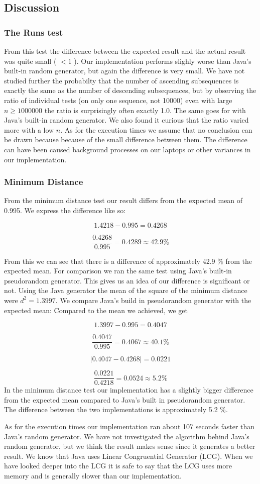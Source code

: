 \subsection{Discussion}
\subsubsection{The Runs test}
From this test the difference between the expected result and the actual result was quite small ( $< 1$ \textperthousand). Our implementation performs slighly worse than Java's built-in random generator, but again the difference is very small. We have not studied further the probabilty that the number of ascending subsequences is exactly the same as the number of descending subsequences, but by observing the ratio of individual tests (on only one sequence, not 10000) even with large $n \ge 1000000$ the ratio is surprisingly often exactly 1.0. The same goes for with Java's built-in random generator. We also found it curious that the ratio varied more with a low $n$. As for the execution times we assume that no conclusion can be drawn because because of the small difference between them. The difference can have been caused background processes on our laptops or other variances in our implementation.

\subsubsection{Minimum Distance}
From the minimum distance test our result differs from the expected mean of 0.995. We express the difference like so:

\[1.4218 - 0.995 = 0.4268\]

\[\frac{0.4268}{0.995} = 0.4289 \approx 42.9 \%\]

From this we can see that there is a difference of approximately 42.9 \% from the expected mean. For comparison we ran the same test using Java's built-in pseudorandom generator. This gives us an idea of our difference is significant or not. Using the Java generator the mean of the square of the minimum distance were $d^2= 1.3997$. We compare Java's build in pseudorandom generator with the expected mean:
Compared to the mean we achieved, we get

\[1.3997 - 0.995 = 0.4047\] 

\[\frac{0.4047}{0.995} = 0.4067 \approx 40.1 \%\]

\[|0.4047 - 0.4268| = 0.0221\]

\[\frac{0.0221}{0.4218} = 0.0524 \approx 5.2 \%\] 
In the minimum distance test our implementation has a slightly bigger difference from the expected mean compared to Java's built in pseudorandom generator. The difference between the two implementations is approximately 5.2 \%. 

As for the execution times our implementation ran about 107 seconds faster than Java's random generator. We have not investigated the algorithm behind Java's random generator, but we think the result makes sense since it generates a better result. We know that Java uses Linear Congruential Generator (LCG). When we have looked deeper into the LCG it is safe to say that the LCG uses more memory and is generally slower than our implementation.  